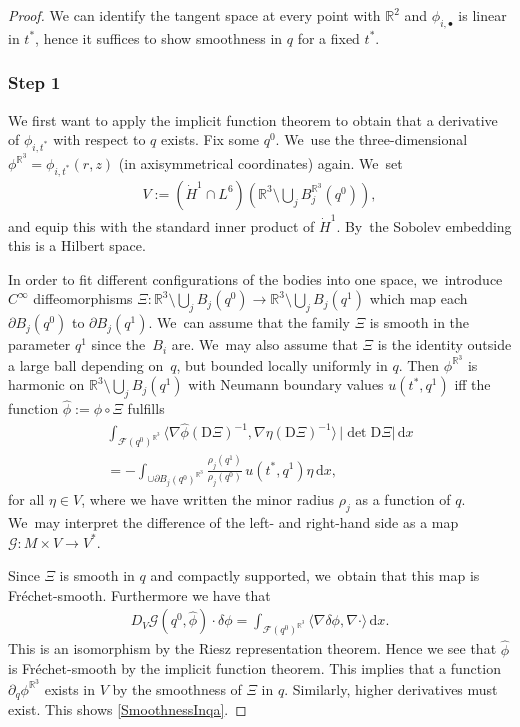 \documentclass[10pt]{amsart}
\let\backslash\setminus
\let\ts\textstyle
\newcommand{\sbullet}{{\scriptscriptstyle\bullet}}
\theoremstyle{definition}
\newcommand\R{\mathbb{R}}
\newcommand\scalar[2]{\langle #1,#2\rangle}
\newcommand\bscalar[2]{\bigl\langle #1,#2\bigr\rangle}
\newcommand\eq{=}
\newcommand\dd{\,\mathrm{d}}
\newcommand\dx{\dd x}
\let\de\partial
\begin{document}
\begin{proof}
We can identify the tangent space at every point with $\R^2$ and $\phi_{i,\sbullet}$ is linear in $t^*$, hence it suffices to show smoothness in $q$ for a fixed $t^*$.

\subsubsection*{Step 1} We first want to apply the implicit function theorem to obtain that a derivative of $\phi_{i,t^*}$ with respect to $q$ exists. Fix some $q^0$. We~use the three-dimensional $\phi^{\R^3}=\phi_{i,t^*}(r,z)$ (in axisymmetrical coordinates) again. We~set
\begin{align*}
\ts
V:= (\dot{H}^1\cap L^6)(\R^3\backslash \bigcup_j B_j^{\R^3}(q^0)),
\end{align*}
and equip this with the standard inner product of $\dot{H}^1$. By~the Sobolev embedding this is a Hilbert space.

In order to fit different configurations of the bodies into one space, we~introduce $C^\infty$ diffeomorphisms $\Xi:\R^3\backslash\bigcup_j B_j(q^0)\to\R^3\backslash \bigcup_j B_j(q^1)$ which map each $\de B_j(q^0)$ to $\de B_j(q^1)$. We~can assume that the family $\Xi$ is smooth in the parameter $q^1$ since the~$B_i$ are. We~may also assume that $\Xi$ is the identity outside a large ball depending on~$q$, but bounded locally uniformly in $q$.
Then $\phi^{\R^3}$ is harmonic on $\R^3\backslash\bigcup_j B_j(q^1)$ with Neumann boundary values $u(t^*,q^1)$ iff the function $\hat{\phi}:=\phi\circ \Xi$ fulfills
\begin{multline}\label{PullbackEq}
\int_{\mathcal{F}(q^0)^{\R^3}}\bscalar{\nabla\hat{\phi}(\text{D}\Xi)^{-1}}{\nabla\eta(\text{D}\Xi)^{-1}}\,|{\det \text{D}\Xi}|\dx\\[-10pt]
\eq-\int_{\cup \de B_j(q^0)^{\R^3}}\frac{\rho_j(q^1)}{\rho_j(q^0)}\,u(t^*,q^1)\eta\dx,
\end{multline}
for all $\eta\in V$, where we have written the minor radius $\rho_j$ as a function of $q$. We~may interpret the difference of the left- and right-hand side as a map $\mathcal{G}:M\times V\to V^*$.

Since $\Xi$ is smooth in $q$ and compactly supported, we~obtain that this map is Fréchet-smooth. Furthermore we have that
\begin{align*}D_V\mathcal{G}(q^0,\hat{\phi})\cdot\delta\phi\eq\int_{\mathcal{F}(q^0)^{\R^3}} \scalar{\nabla\delta\phi}{\nabla\cdot}\dx.
\end{align*}
This is an isomorphism by the Riesz representation theorem. Hence we see that $\hat{\phi}$ is Fréchet-smooth by the implicit function theorem.
This implies that a function $\de_q\phi^{\R^3}$ exists in $V$ by the smoothness of $\Xi$ in $q$. Similarly, higher derivatives must exist. This shows \eqref{SmoothnessInqa}.


\end{proof}
\end{document}
